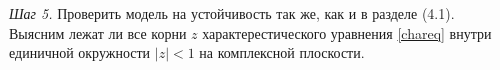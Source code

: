 \documentclass[12pt, fleqn]{article}
\begin{document}
{{{			\textit{Шаг 5.} Проверить модель на устойчивость так же, как и в разделе (4.1). Выясним лежат ли все корни $z$ характерестического уравнения \eqref{chareq} внутри единичной окружности $ \left| z \right| < 1 $ на комплексной плоскости.\medskip
					  
%			
%			
%			
%			
}}}
\end{document}
